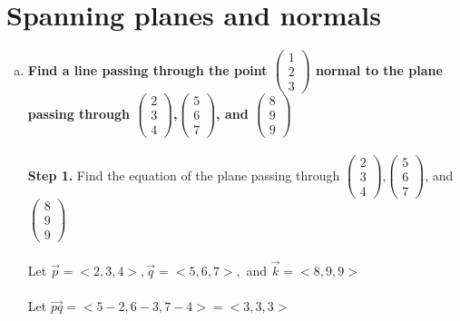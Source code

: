 \documentclass{article}
\begin{document}
\section{Spanning planes and normals}
\begin{enumerate}[a.]
	\item\textbf{Find a line passing through the point $\left(\!
	      \begin{array}{c}
	      	1 \\
	      	2 \\
	      	3 
	      \end{array}
	      \!\right)$ normal to the plane passing through $\left(\!
	      \begin{array}{c}
	      	2 \\
	      	3 \\
	      	4 
	      \end{array}
	      \!\right)$,$\left(\!
	      \begin{array}{c}
	      	5 \\
	      	6 \\
	      	7 
	      \end{array}
	      \!\right)$, and $\left(\!
	      \begin{array}{c}
	      	8 \\
	      	9 \\
	      	9 
	      \end{array}
	      \!\right)$ }\\
	\\
	\textbf{Step 1.} Find the equation of the plane passing through $\left(\!
	\begin{array}{c}
		2 \\
		3 \\
		4 
	\end{array}
	\!\right)$,$\left(\!
	\begin{array}{c}
		5 \\
		6 \\
		7 
	\end{array}
	\!\right)$, and $\left(\!
	\begin{array}{c}
		8 \\
		9 \\
		9 
	\end{array}
	\!\right)$\\
	\\
	Let $\vec{p}=<2,3,4>, \vec{q}=<5,6,7>,$ and $\vec{k}=<8,9,9>$\\
	\\
	Let $\vec{pq} = <5-2,6-3,7-4>=<3,3,3>$\\

\end{enumerate}
\end{document}
